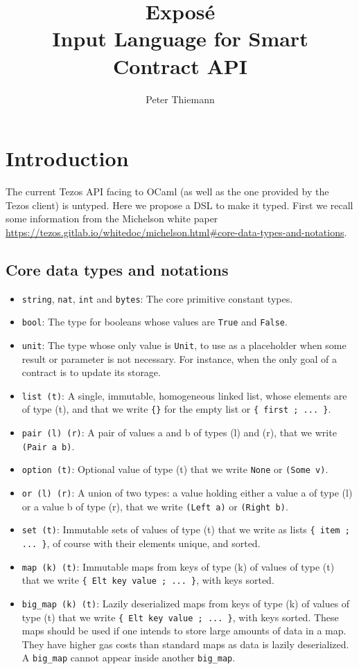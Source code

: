 \documentclass{article}
\title{Expos\'{e}\\
  Input Language for Smart Contract API}
\author{Peter Thiemann}
\begin{document}
\maketitle{}

\section{Introduction}
\label{sec:introduction}

The current Tezos API facing to OCaml (as well as the one provided by
the Tezos client) is untyped. Here we propose a DSL to make it typed.
First we recall some information from the Michelson white paper
\url{https://tezos.gitlab.io/whitedoc/michelson.html#core-data-types-and-notations}. 

\subsection{Core data types and notations}

\begin{itemize}
\item \texttt{string}, \texttt{nat}, \texttt{int} and \texttt{bytes}: The core primitive constant types.
\item 
  \texttt{bool}: The type for booleans whose values are \texttt{True} and \texttt{False}.
\item 
  \texttt{unit}: The type whose only value is \texttt{Unit}, to use as a placeholder
  when some result or parameter is not necessary. For instance, when
  the only goal of a contract is to update its storage.
\item 
  \texttt{list (t)}: A single, immutable, homogeneous linked list, whose
  elements are of type (t), and that we write \texttt{\{\}} for the empty list or
  \texttt{\{ first ; ... \}}. 
\item 
  \texttt{pair (l) (r)}: A pair of values a and b of types (l) and (r), that we
  write \texttt{(Pair a b)}.
\item 
  \texttt{option (t)}: Optional value of type (t) that we write \texttt{None} or \texttt{(Some
  v)}.
\item 
  \texttt{or (l) (r)}: A union of two types: a value holding either a value a
  of type (l) or a value b of type (r), that we write \texttt{(Left a)} or
  \texttt{(Right b)}.
\item 
  \texttt{set (t)}: Immutable sets of values of type (t) that we write as lists
  \texttt{\{ item ; ... \}}, of course with their elements unique, and sorted.
\item 
  \texttt{map (k) (t)}: Immutable maps from keys of type (k) of values of type
  (t) that we write \texttt{\{ Elt key value ; ... \}}, with keys sorted.
\item 
  \texttt{big\_map (k) (t)}: Lazily deserialized maps from keys of type (k) of
  values of type (t) that we write \texttt{\{ Elt key value ; ... \}}, with keys
  sorted. These maps should be used if one intends to store large
  amounts of data in a map. They have higher gas costs than standard
  maps as data is lazily deserialized. A \texttt{big\_map} cannot appear inside
  another \texttt{big\_map}.
\end{itemize}
\end{document}
